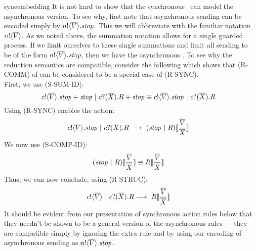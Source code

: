 \begin{example}{syncembedding}
	It is not hard to show that the synchronous \picalc\ can model the asynchronous version.  
To see why, first note that asynchronous sending can be encoded simply by ${n}!\langle{ \ensuremath{\overline{V}} }\rangle.\mbox{\emph{stop}}$.  
This we will abbreviate with the familiar notation ${n}!\langle{ \ensuremath{\overline{V}} }\rangle$.  
As we noted above, the summation notation allows for a single guarded process.  
If we limit ourselves to these single summations and limit all sending to be of the form ${n}!\langle{ \ensuremath{\overline{V}} }\rangle.\mbox{\emph{stop}}$, then we have the asynchronous \picalc.  
To see why the reduction semantics are compatible, consider the following which shows that (R-COMM) of  can be considered to be a special case of (R-SYNC).\\

\noindent First, we use (S-SUM-ID):
\[
	{c}!\langle{ \ensuremath{\overline{V}} }\rangle. \mbox{\emph{stop}} + \mbox{\emph{stop}} \ |\  {c}?({\overline{X}}).R + \mbox{\emph{stop}} \equiv {c}!\langle{ \ensuremath{\overline{V}} }\rangle.\mbox{\emph{stop}} \ |\  {c}?({\overline{X}}).R
\]
Using (R-SYNC) enables the action:
\[
	\ssend{c}{\tuple{V}}\pstop \comp \receive{c}{\tuple{X}}R \pred\  (\pstop \comp R)\subst{\tuple{V}}{\tuple{X}}
\]
We now use (S-COMP-ID):
\[
	(\pstop \comp R)\subst{\tuple{V}}{\tuple{X}}\sequiv R\subst{\tuple{V}}{\tuple{X}}
\]
Thus, we can now conclude, using (R-STRUC):
\[
	\send{c}{\tuple{V}} \comp \receive{c}{\tuple{X}}R \pred\  R \subst{\tuple{V}}{\tuple{X}}
\]
	It should be evident from our presentation of synchronous action rules below that they needn't be shown to be a general version of the asynchronous rules --- they are compatible simply by ignoring the extra rule and by using our encoding of asynchronous sending as ${n}!\langle{ \ensuremath{\overline{V}} }\rangle.\mbox{\emph{stop}}$.
\end{example}

